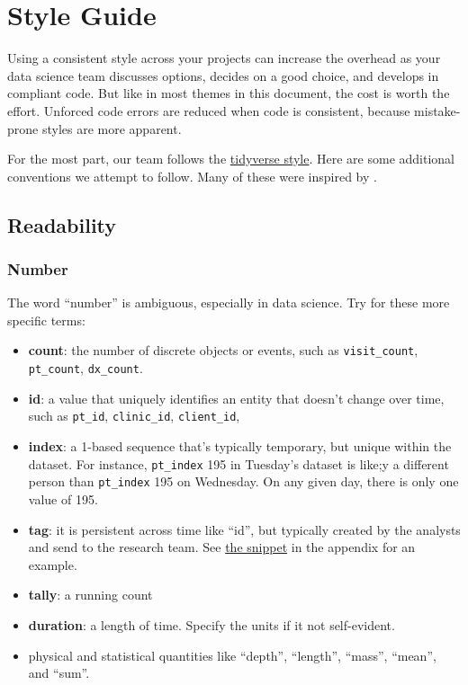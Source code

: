 \documentclass[
]{book}
\providecommand{\tightlist}{%
  \setlength{\itemsep}{0pt}\setlength{\parskip}{0pt}}
\begin{document}
\hypertarget{style}{%
\chapter{Style Guide}\label{style}}

Using a consistent style across your projects can increase the overhead as your data science team discusses options, decides on a good choice, and develops in compliant code. But like in most themes in this document, the cost is worth the effort. Unforced code errors are reduced when code is consistent, because mistake-prone styles are more apparent.

For the most part, our team follows the \href{https://style.tidyverse.org/}{tidyverse style}. Here are some additional conventions we attempt to follow. Many of these were inspired by \citep{balena-dimauro}.

\hypertarget{readability}{%
\section{Readability}\label{readability}}

\hypertarget{style-number}{%
\subsection{Number}\label{style-number}}

The word ``number'' is ambiguous, especially in data science. Try for these more specific terms:

\begin{itemize}
\tightlist
\item
  \textbf{count}: the number of discrete objects or events, such as \texttt{visit\_count}, \texttt{pt\_count}, \texttt{dx\_count}.
\item
  \textbf{id}: a value that uniquely identifies an entity that doesn't change over time, such as \texttt{pt\_id}, \texttt{clinic\_id}, \texttt{client\_id},
\item
  \textbf{index}: a 1-based sequence that's typically temporary, but unique within the dataset. For instance, \texttt{pt\_index} 195 in Tuesday's dataset is like;y a different person than \texttt{pt\_index} 195 on Wednesday. On any given day, there is only one value of 195.
\item
  \textbf{tag}: it is persistent across time like ``id'', but typically created by the analysts and send to the research team. See \protect\hyperlink{snippet-tag}{the snippet} in the appendix for an example.
\item
  \textbf{tally}: a running count
\item
  \textbf{duration}: a length of time. Specify the units if it not self-evident.
\item
  physical and statistical quantities like
  ``depth'',
  ``length'',
  ``mass'',
  ``mean'', and
  ``sum''.
\end{itemize}
\end{document}
